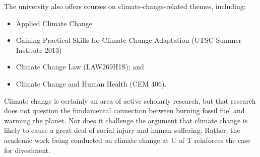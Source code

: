 The university also offers courses on climate-change-related themes, including:
\begin{itemize}
	\item Applied Climate Change
	\item Gaining Practical Skills for Climate Change Adaptation (UTSC Summer Institute 2013)
	\item Climate Change Law (LAW269H1S); and
	\item Climate Change and Human Health (CEM 406).
\end{itemize}



Climate change is certainly an area of active scholarly research, but that research does not question the fundamental connection between burning fossil fuel and warming the planet. 
Nor does it challenge the argument that climate change is likely to cause a great deal of social injury and human suffering.
Rather, the academic work being conducted on climate change at U of T reinforces the case for divestment.

